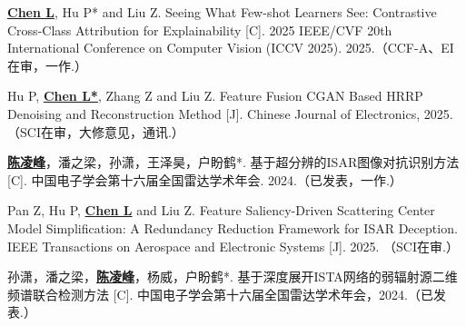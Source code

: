 \begin{resume}
\begin{enumerate}[label={[\arabic*]},itemsep=0pt,parsep=0pt,labelindent=26pt,labelwidth=*,leftmargin=0pt,itemindent=*,align=left]
  \item \textbf{\underline{Chen L}}, Hu P* and Liu Z. Seeing What Few-shot Learners See: Contrastive Cross-Class Attribution for Explainability [C]. 2025 IEEE/CVF 20th International Conference on Computer Vision (ICCV 2025). 2025.（CCF-A、EI在审，一作.）
  \item Hu P, \textbf{\underline{Chen L*}}, Zhang Z and Liu Z. Feature Fusion CGAN Based HRRP Denoising and Reconstruction Method [J]. Chinese Journal of Electronics, 2025. （SCI在审，大修意见，通讯.）
  \item \textbf{\underline{陈凌峰}}，潘之梁，孙潇，王泽昊，户盼鹤*. 基于超分辨的ISAR图像对抗识别方法 [C]. 中国电子学会第十六届全国雷达学术年会. 2024.（已发表，一作.）
  \item Pan Z, Hu P, \textbf{\underline{Chen L}} and Liu Z. Feature Saliency-Driven Scattering Center Model Simplification: A Redundancy Reduction Framework for ISAR Deception. IEEE Transactions on Aerospace and Electronic Systems [J]. 2025. （SCI在审.）
  \item 孙潇，潘之梁，\textbf{\underline{陈凌峰}}，杨威，户盼鹤*. 基于深度展开ISTA网络的弱辐射源二维频谱联合检测方法 [C]. 中国电子学会第十六届全国雷达学术年会，2024.（已发表.）
  \end{enumerate}


\end{resume}
